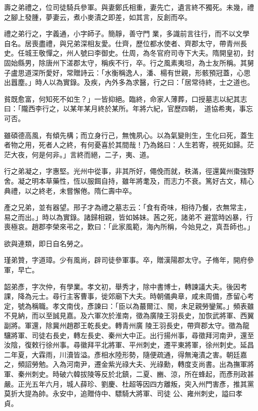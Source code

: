 \begin{pinyinscope}
 壽之弟禮之，位司徒騎兵參軍。與妻鄭氏相重，妻先亡，遺言終不獨死。未幾，禮之腳上發腫，夢妻云，煮小麥漬之即差，如其言，反創而卒。



 禮之弟行之，字義通，小字師子。簡靜，善守門
 業，多識前言往行，而不以文學自名。居喪盡禮，與兄弟深相友愛。仕齊，歷位都水使者、齊郡太守，帶青州長史。任城王敬憚之，州人號曰李御史。仕周，為冬官府司寺下大夫。隋開皇初，封固始縣男，除唐州下溠郡太守，稱疾不行，卒。行之風素夷坦，為士友所稱。其舅子盧思道深所愛好，常贈詩云：「水衡稱逸人，潘、楊有世親，形骸預冠蓋，心思出囂塵。」時人以為實錄。及疾，內外多為求醫，行之曰：「居常待終，士之道也。



 貧既愈富，何知死不如生？」一皆抑絕。臨終，命家人薄葬，口授墓志以紀其志曰：「隴西李行之，以某年某月終於某所。年將六紀，官歷四朝，
 道協希夷，事忘可否。



 雖碩德高風，有傾先構；而立身行己，無愧夙心。以為氣變則生，生化曰死，蓋生者物之用，死者人之終，有何憂喜於其間哉！乃為銘曰：人生若寄，視死如歸。茫茫大夜，何是何非。」言終而絕，二子，夷、道。



 行之弟凝之，字惠堅。光州中從事，非其所好，僶俛而就，秩滿，徑還冀州棗強野舍。凝之明本草藥性，恆以服餌自持，雖年將耄及，而志力不衰。篤好古文，精心典禮，以之終老，未嘗懈倦。隋仁壽中卒。



 產之兄弟，並有器望。邢子才為禮之墓志云：「食有奇味，相待乃餐，衣無常主，易之而出。」時以為實錄。諸歸相親，皆如姊妹。茜之死，諸弟不
 避當時凶暴，行喪極哀。趙郡李榮來弔之，歎曰：「此家風範，海內所稱，今始見之，真吾師也。」



 欲與連類，即日自名勞之。



 瑾弟贊，字道璋。少有風尚，辟司徒參軍事。卒，贈漢陽郡太守。子脩年，開府參軍，早亡。



 韶弟彥，字次仲，有學業。孝文初，舉秀才，除中書博士，轉諫議大夫。後因考課，降為元士。尋行主客曹事，徙郊廟下大夫。時朝儀典章，咸未周備，彥留心考定，號為稱職。孝文南伐，彥諫曰：「臣以為蕞爾江、閩，未足親勞鑾駕。」頻表雖不見納，而以至誠見嘉。及六軍次於淮南，徵為廣陵王羽長史，加恢武將軍、西翼副將。軍還，除冀州趙郡王乾長史。轉青州廣
 陵王羽長史，帶齊郡太守。徵為龍驤將軍、司徒右長史，轉左長史、秦州大中正。出行揚州事，尋徵拜河南尹，還至汝陰，復敕行徐州事。尋徽拜平北將軍、平州刺史，遷平東將軍，徐州刺史。延昌二年夏，大霖雨，川瀆皆溢。彥相水陸形勢，隨便疏通，得無淹漬之害。朝廷嘉之，頻詔勞勉。入為河南尹，遷金紫光祿大夫、光祿勳，轉度支尚書。出為撫軍將軍、秦州刺史。時破六韓拔陵等反於北鎮，二夏、豳、涼，所在蜂起，而彥刑政甚嚴。正光五年六月，城人薛珍、劉慶、杜超等因四方離叛，突入州門害彥，推其黨莫折大提為帥。永安中，追贈侍中、驃騎大將軍、司徒
 公、雍州刺史，謚曰孝貞。




\end{pinyinscope}
